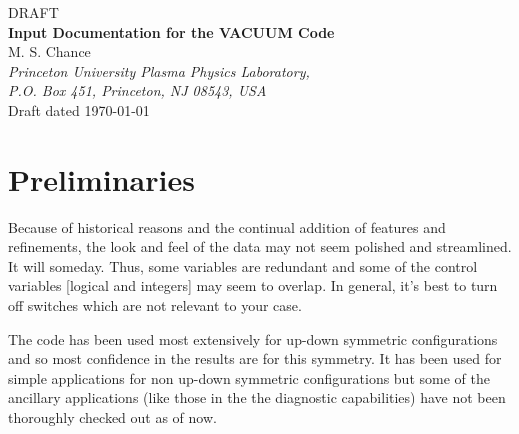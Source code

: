 \documentclass[10pt]{article}
\begin{document}
%
%
\begin{center}
{\large\textsf{DRAFT}}\\[1.ex]
\textbf{Input Documentation for the {\small VACUUM} Code}\\
%
M. S. Chance\\

\textit{Princeton University Plasma Physics Laboratory,\\
P.O. Box 451, Princeton, NJ 08543, USA
}\\
%
Draft dated \today
%
\end{center}
%
%
\section{Preliminaries}

Because of historical reasons and the continual addition of features
and refinements, the look and feel of the data may not seem polished
and streamlined. It will someday. Thus, some variables are redundant
and some of the control variables [logical and integers] may seem to
overlap. In general, it's best to turn off switches which are not
relevant to your case.

The code has been used most extensively for up-down symmetric
configurations and so most confidence in the results are for this
symmetry. It has been used for simple applications for non up-down
symmetric configurations but some of the ancillary applications (like
those in the the diagnostic capabilities) have not been thoroughly
checked out as of now.
\end{document}
